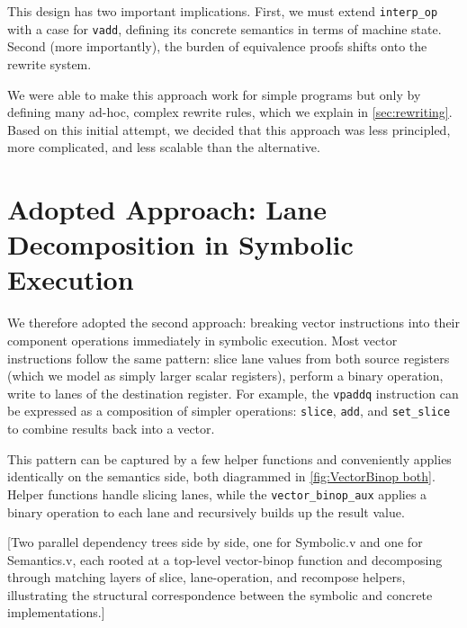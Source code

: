 This design has two important implications.
First, we must extend \texttt{interp_op} with a case for \texttt{vadd}, defining its concrete semantics in terms of machine state.
Second (more importantly), the burden of equivalence proofs shifts onto the rewrite system.

We were able to make this approach work for simple programs but only by defining many ad-hoc, complex rewrite rules, which we explain in \autoref{sec:rewriting}. Based on this initial attempt, we decided that this approach was less principled, more complicated, and less scalable than the alternative.

\section{Adopted Approach: Lane Decomposition in Symbolic Execution}
\label{sec:lane-decomposition}

We therefore adopted the second approach: breaking vector instructions into their component operations immediately in symbolic execution.
Most vector instructions follow the same pattern: slice lane values from both source registers (which we model as simply larger scalar registers), perform a binary operation, write to lanes of the destination register.
For example, the \texttt{vpaddq} instruction can be expressed as a composition of simpler operations: \texttt{slice}, \texttt{add}, and \texttt{set_slice} to combine results back into a vector.

This pattern can be captured by a few helper functions and conveniently applies identically on the semantics side, both diagrammed in \autoref{fig:VectorBinop both}.
Helper functions handle slicing lanes, while the \texttt{vector_binop_aux} applies a binary operation to each lane and recursively builds up the result value.

[Two parallel dependency trees side by side, one for Symbolic.v and one for Semantics.v, each rooted at a top-level vector-binop function and decomposing through matching layers of slice, lane-operation, and recompose helpers, illustrating the structural correspondence between the symbolic and concrete implementations.]


